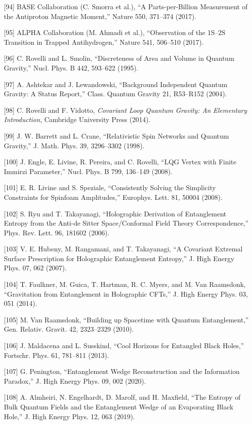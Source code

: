 \documentclass[aps,prd,onecolumn,superscriptaddress,nofootinbib,longbibliography,10pt]{revtex4-2}
\begin{document}
  [94] BASE Collaboration (C. Smorra et al.), “A Parts-per-Billion Measurement of the Antiproton Magnetic Moment,” Nature 550, 371–374 (2017).


  [95] ALPHA Collaboration (M. Ahmadi et al.), “Observation of the 1S–2S Transition in Trapped Antihydrogen,” Nature 541, 506–510 (2017).


  [96] C. Rovelli and L. Smolin, “Discreteness of Area and Volume in Quantum Gravity,” Nucl. Phys. B 442, 593–622 (1995).


  [97] A. Ashtekar and J. Lewandowski, “Background Independent Quantum Gravity: A Status Report,” Class. Quantum Gravity 21, R53–R152 (2004).


  [98] C. Rovelli and F. Vidotto, \textit{Covariant Loop Quantum Gravity: An Elementary Introduction}, Cambridge University Press (2014).


  [99] J. W. Barrett and L. Crane, “Relativistic Spin Networks and Quantum Gravity,” J. Math. Phys. 39, 3296–3302 (1998).


  [100] J. Engle, E. Livine, R. Pereira, and C. Rovelli, “LQG Vertex with Finite Immirzi Parameter,” Nucl. Phys. B 799, 136–149 (2008).


  [101] E. R. Livine and S. Speziale, “Consistently Solving the Simplicity Constraints for Spinfoam Amplitudes,” Europhys. Lett. 81, 50004 (2008).


  [102] S. Ryu and T. Takayanagi, “Holographic Derivation of Entanglement Entropy from the Anti-de Sitter Space/Conformal Field Theory Correspondence,” Phys. Rev. Lett. 96, 181602 (2006).


  [103] V. E. Hubeny, M. Rangamani, and T. Takayanagi, “A Covariant Extremal Surface Prescription for Holographic Entanglement Entropy,” J. High Energy Phys. 07, 062 (2007).


  [104] T. Faulkner, M. Guica, T. Hartman, R. C. Myers, and M. Van Raamsdonk, “Gravitation from Entanglement in Holographic CFTs,” J. High Energy Phys. 03, 051 (2014).


  [105] M. Van Raamsdonk, “Building up Spacetime with Quantum Entanglement,” Gen. Relativ. Gravit. 42, 2323–2329 (2010).


  [106] J. Maldacena and L. Susskind, “Cool Horizons for Entangled Black Holes,” Fortschr. Phys. 61, 781–811 (2013).


  [107] G. Penington, “Entanglement Wedge Reconstruction and the Information Paradox,” J. High Energy Phys. 09, 002 (2020).


  [108] A. Almheiri, N. Engelhardt, D. Marolf, and H. Maxfield, “The Entropy of Bulk Quantum Fields and the Entanglement Wedge of an Evaporating Black Hole,” J. High Energy Phys. 12, 063 (2019).
\end{document}
